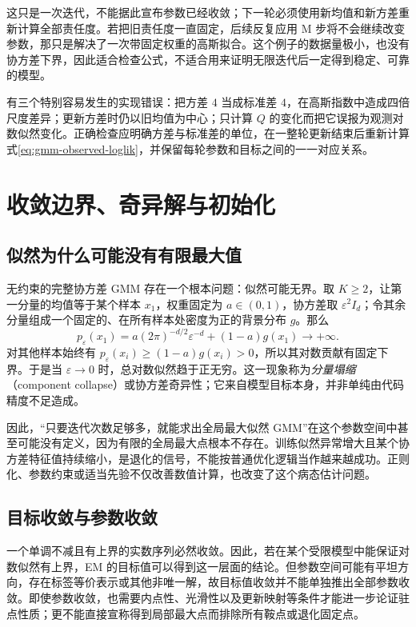 \documentclass[UTF8,12pt,a4paper,fontset=fandol]{ctexart}
\begin{document}
这只是一次迭代，不能据此宣布参数已经收敛；下一轮必须使用新均值和新方差重新计算全部责任度。若把旧责任度一直固定，后续反复应用 M 步将不会继续改变参数，那只是解决了一次带固定权重的高斯拟合。这个例子的数据量极小，也没有协方差下界，因此适合检查公式，不适合用来证明无限迭代后一定得到稳定、可靠的模型。

有三个特别容易发生的实现错误：把方差 $4$ 当成标准差 $4$，在高斯指数中造成四倍尺度差异；更新方差时仍以旧均值为中心；只计算 $Q$ 的变化而把它误报为观测对数似然变化。正确检查应明确方差与标准差的单位，在一整轮更新结束后重新计算式\eqref{eq:gmm-observed-loglik}，并保留每轮参数和目标之间的一一对应关系。

\section{收敛边界、奇异解与初始化}
\label{sec:gmm-pathologies}

\subsection{似然为什么可能没有有限最大值}
无约束的完整协方差 GMM 存在一个根本问题：似然可能无界。取 $K\geq2$，让第一分量的均值等于某个样本 $x_1$，权重固定为 $a\in(0,1)$，协方差取 $\varepsilon^2I_d$；令其余分量组成一个固定的、在所有样本处密度为正的背景分布 $g$。那么
\[
p_\varepsilon(x_1)=a(2\pi)^{-d/2}\varepsilon^{-d}+(1-a)g(x_1)\longrightarrow+\infty.
\]
对其他样本始终有 $p_\varepsilon(x_i)\geq(1-a)g(x_i)>0$，所以其对数贡献有固定下界。于是当 $\varepsilon\to0$ 时，总对数似然趋于正无穷。这一现象称为\emph{分量塌缩}（component collapse）或协方差奇异性；它来自模型目标本身，并非单纯由代码精度不足造成。

因此，“只要迭代次数足够多，就能求出全局最大似然 GMM”在这个参数空间中甚至可能没有定义，因为有限的全局最大点根本不存在。训练似然异常增大且某个协方差特征值持续缩小，是退化的信号，不能按普通优化逻辑当作越来越成功。正则化、参数约束或适当先验不仅改善数值计算，也改变了这个病态估计问题。

\subsection{目标收敛与参数收敛}
一个单调不减且有上界的实数序列必然收敛。因此，若在某个受限模型中能保证对数似然有上界，EM 的目标值可以得到这一层面的结论。但参数空间可能有平坦方向，存在标签等价表示或其他非唯一解，故目标值收敛并不能单独推出全部参数收敛。即使参数收敛，也需要内点性、光滑性以及更新映射等条件才能进一步论证驻点性质；更不能直接宣称得到局部最大点而排除所有鞍点或退化固定点。
\end{document}
